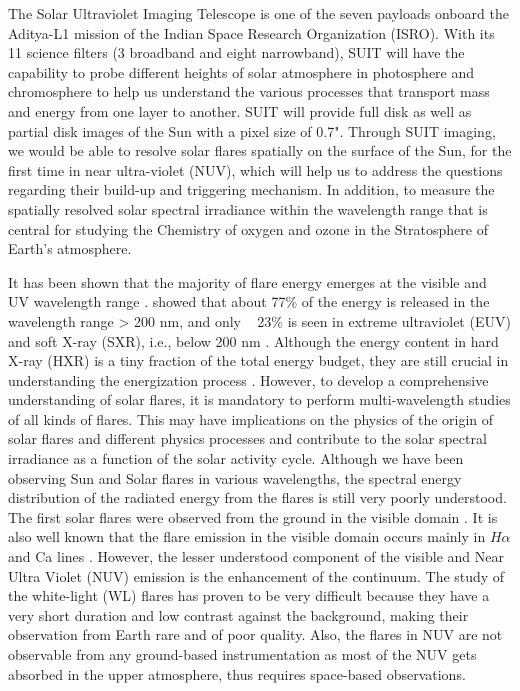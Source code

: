 {The Solar Ultraviolet Imaging Telescope \citep[SUIT;][]{ghosh16,article} is one of the seven payloads onboard the Aditya-L1 mission \citep{adityal1} of the Indian Space Research Organization (ISRO). With its 11 science filters (3 broadband and eight narrowband), SUIT will have the capability to probe different heights of solar atmosphere in photosphere and chromosphere to help us understand the various processes that transport mass and energy from one layer to another. SUIT will provide full disk as well as partial disk images of the Sun with a pixel size of 0.7". Through SUIT imaging, we would be able to resolve solar flares spatially on the surface of the Sun, for the first time in near ultra-violet (NUV), which will help us to address the questions regarding their build-up and triggering mechanism. In addition, to measure the spatially resolved solar spectral irradiance within the wavelength range that is central for studying the Chemistry of oxygen and ozone in the Stratosphere of Earth's atmosphere.

It has been shown that the majority of flare energy emerges at the visible and UV wavelength range \citep{woods06}. \cite{woods04} showed that about 77\% of the energy is released in the wavelength range > 200 nm, and only ~ 23\% is seen in extreme ultraviolet (EUV) and soft X-ray (SXR), i.e., below 200 nm \citep{Nei_1989,neidig93,kretzschmar11}. Although the energy content in hard X-ray (HXR) is a tiny fraction of the total energy budget, they are still crucial in understanding the energization process \citep{holeman11}. However, to develop a comprehensive understanding of solar flares, it is mandatory to perform multi-wavelength studies of all kinds of flares. This may have implications on the physics of the origin of solar flares and different physics processes and contribute to the solar spectral irradiance as a function of the solar activity cycle. Although we have been observing Sun and Solar flares in various wavelengths, the spectral energy distribution of the radiated energy from the flares is still very poorly understood. The first solar flares were observed from the ground in the visible domain \citep{carrington1859,neidig93}. It is also well known that the flare emission in the visible domain occurs mainly in $H\alpha$ and Ca  lines \citep{canfield90,falchi92,heinzel94}. However, the lesser understood component of the visible and Near Ultra Violet (NUV) emission is the enhancement of the continuum. The study of the white-light (WL) flares has proven to be very difficult because they have a very short duration and low contrast against the background, making their observation from Earth rare and of poor quality. Also, the flares in NUV are not observable from any ground-based instrumentation as most of the NUV gets absorbed in the upper atmosphere, thus requires space-based observations.

}
